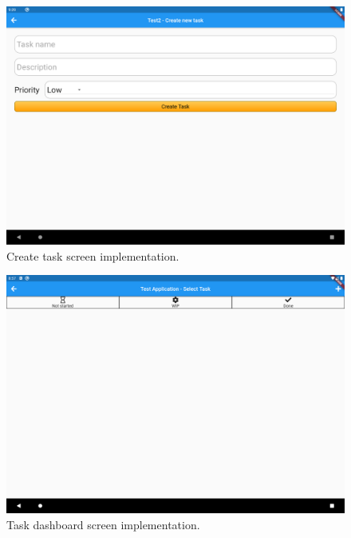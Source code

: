 \begin{figure}[H]
    \includegraphics[width=\textwidth]{Sprint_1/images/create_task_screen_app.png}
    \caption{Create task screen implementation.}
    \label{create_task_screen_app}

\end{figure}

\begin{figure}[H]
    \includegraphics[width=\textwidth]{Sprint_1/images/task_dashboard_screen_app.png}
    \caption{Task dashboard screen implementation.}
    \label{task_dashboard_screen_app}
\end{figure}